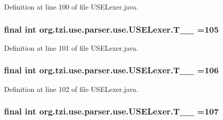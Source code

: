 Definition at line 100 of file U\-S\-E\-Lexer.\-java.

\hypertarget{classorg_1_1tzi_1_1use_1_1parser_1_1use_1_1_u_s_e_lexer_ab2e98b92a8d7cab8962b52bda94631c1}{
\subsubsection[{T\-\_\-\-\_\-105}]{\setlength{\rightskip}{0pt plus 5cm}final int org.\-tzi.\-use.\-parser.\-use.\-U\-S\-E\-Lexer.\-T\-\_\-\-\_ =105\hspace{0.3cm}{\ttfamily [static]}}}\label{classorg_1_1tzi_1_1use_1_1parser_1_1use_1_1_u_s_e_lexer_ab2e98b92a8d7cab8962b52bda94631c1}


Definition at line 101 of file U\-S\-E\-Lexer.\-java.

\hypertarget{classorg_1_1tzi_1_1use_1_1parser_1_1use_1_1_u_s_e_lexer_a9dea6415ed5c9994da341cdf136bb03a}{
\subsubsection[{T\-\_\-\-\_\-106}]{\setlength{\rightskip}{0pt plus 5cm}final int org.\-tzi.\-use.\-parser.\-use.\-U\-S\-E\-Lexer.\-T\-\_\-\-\_ =106\hspace{0.3cm}{\ttfamily [static]}}}\label{classorg_1_1tzi_1_1use_1_1parser_1_1use_1_1_u_s_e_lexer_a9dea6415ed5c9994da341cdf136bb03a}


Definition at line 102 of file U\-S\-E\-Lexer.\-java.

\hypertarget{classorg_1_1tzi_1_1use_1_1parser_1_1use_1_1_u_s_e_lexer_ae9068e362ab0a6c55fe40eaa0047dbcf}{
\subsubsection[{T\-\_\-\-\_\-107}]{\setlength{\rightskip}{0pt plus 5cm}final int org.\-tzi.\-use.\-parser.\-use.\-U\-S\-E\-Lexer.\-T\-\_\-\-\_ =107\hspace{0.3cm}{\ttfamily [static]}}}\label{classorg_1_1tzi_1_1use_1_1parser_1_1use_1_1_u_s_e_lexer_ae9068e362ab0a6c55fe40eaa0047dbcf}


